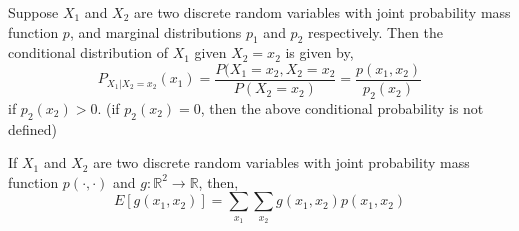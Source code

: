 \begin{definition}
Suppose $X_1$ and $X_2$ are two discrete random variables with joint
probability mass function $p$, and marginal distributions $p_1$ and $p_2$
respectively. Then the conditional distribution of $X_1$ given $X_2 = x_2$ is
given by,
\[
    P_{X_1 \vert X_2 = x_2}(x_1) = \frac {P(X_1 = x_2, X_2 = x_2}
                                         {P(X_2 = x_2)}
                                 = \frac {p(x_1, x_2)}{p_2(x_2)}
\]
if $p_2(x_2) > 0$. (if $p_2(x_2) = 0$, then the above conditional probability
is not defined)
\end{definition}

\begin{theorem}[restatement]
If $X_1$ and $X_2$ are two discrete random variables with joint probability
mass function $p(\cdot, \cdot)$ and $g : \mathbb{R}^2 \rightarrow \mathbb{R}$,
then,
\[
    E[g(x_1, x_2)] = \sum_{x_1} \sum_{x_2} g(x_1, x_2) p(x_1, x_2)
\]
\end{theorem}

